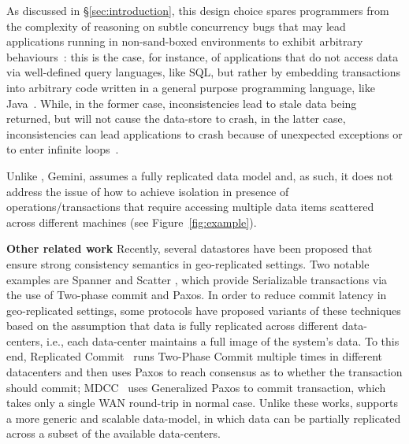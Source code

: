 As discussed in \S \ref{sec:introduction}, this design choice spares programmers from the complexity of reasoning on subtle concurrency bugs that may lead applications running in non-sand-boxed environments  to exhibit arbitrary behaviours~\cite{opacity, virtualWorldConsistency}: this is the case, for instance, of applications that do not access data via well-defined query languages, like SQL, but rather by embedding transactions into arbitrary code written in a general purpose programming language, like Java~\cite{javaPersistenceAPI}. While, in the former case, inconsistencies lead to stale data being returned, but will not cause the data-store to crash, in the latter case, inconsistencies can lead applications to crash because of unexpected exceptions or to enter infinite loops~\cite{transactionsAreBackButTheyAreNotTheSame}. 

Unlike \specula, Gemini, assumes a fully replicated data model and, as such, it does not address the issue of how to achieve isolation in presence of operations/transactions that require accessing multiple data items scattered across different machines (see Figure~\ref{fig:example}).
\fi
 
\textbf{Other related work} Recently, several datastores have been proposed that ensure strong consistency semantics in geo-replicated settings. Two notable examples are Spanner \cite{spanner} and Scatter \cite{scatter}, which provide Serializable transactions via the use of Two-phase commit and Paxos. In order to reduce commit latency in geo-replicated settings, some protocols have proposed variants of these techniques based on the assumption that data is fully replicated across different data-centers, i.e., each data-center maintains a full image of the system's data. To this end, Replicated Commit~\cite{mahmoud2013low} runs Two-Phase Commit multiple times in different datacenters and then uses Paxos to reach consensus as to whether the transaction should commit; MDCC~\cite{kraska2013mdcc} uses Generalized Paxos \cite{lamport2005generalized} to commit transaction, which takes only a single WAN round-trip in normal case. Unlike these works, \specula supports a more generic and scalable data-model, in which data can be partially replicated across a subset of the available data-centers.

